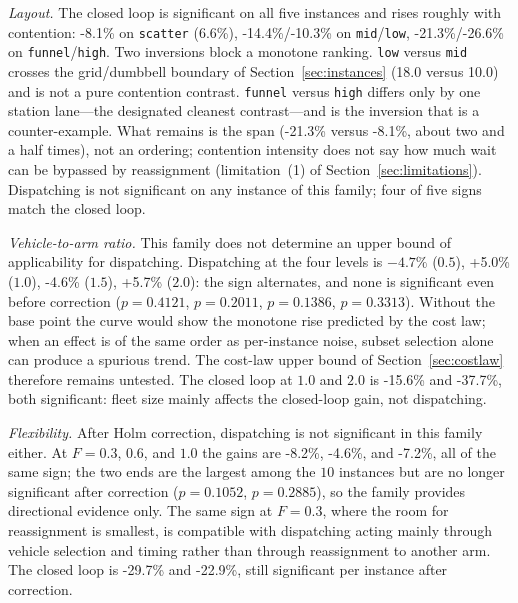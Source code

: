 \documentclass[manuscript,screen,review]{acmart}
\newcommand{\NCases}{10}
\newcommand{\GainProbeStarve}{4.7\%}     %
\newcommand{\GainProbeFleetBase}{-4.6\%} %
\newcommand{\GainProbeFleetOne}{+5.0\%}  %
\newcommand{\GainProbeFleetTwo}{+5.7\%}  %
\newcommand{\GainLoopFunnel}{-21.3\%}    %
\newcommand{\GainLoopHigh}{-26.6\%}      %
\newcommand{\GainLoopMid}{-14.4\%}       %
\newcommand{\GainLoopLow}{-10.3\%}       %
\newcommand{\GainLoopScatter}{-8.1\%}    %
\newcommand{\GainLoopFleetOne}{-15.6\%}  %
\newcommand{\GainLoopFleetTwo}{-37.7\%}  %
\newcommand{\GainLoopFlexLo}{-29.7\%}    %
\newcommand{\GainLoopFlexHi}{-22.9\%}    %
\newcommand{\GainProbeFlexLo}{-8.2\%}    %
\newcommand{\GainProbeFlexHi}{-7.2\%}    %
\newcommand{\PProbeFleetHalfRaw}{=0.4121}
\newcommand{\PProbeFleetOneRaw}{=0.2011}
\newcommand{\PProbeFleetBaseRaw}{=0.1386}
\newcommand{\PProbeFleetTwoRaw}{=0.3313}
\newcommand{\PProbeFlexLoHolm}{=0.1052}
\newcommand{\PProbeFlexHiHolm}{=0.2885}
\newcommand{\ContentionLo}{6.6\%}
\newcommand{\LegDumbbell}{10.0}          %
\newcommand{\LegGrid}{18.0}              %
\begin{document}
\emph{Layout.}
The closed loop is significant on all five instances and rises roughly with contention: \GainLoopScatter{} on \texttt{scatter} (\ContentionLo{}), \GainLoopMid{}/\GainLoopLow{} on \texttt{mid}/\texttt{low}, \GainLoopFunnel{}/\GainLoopHigh{} on \texttt{funnel}/\texttt{high}.
Two inversions block a monotone ranking.
\texttt{low} versus \texttt{mid} crosses the grid/dumbbell boundary of Section~\ref{sec:instances} (\LegGrid{} versus \LegDumbbell{}) and is not a pure contention contrast.
\texttt{funnel} versus \texttt{high} differs only by one station lane---the designated cleanest contrast---and is the inversion that is a counter-example.
What remains is the span (\GainLoopFunnel{} versus \GainLoopScatter{}, about two and a half times), not an ordering; contention intensity does not say how much wait can be bypassed by reassignment (limitation~(1) of Section~\ref{sec:limitations}).
Dispatching is not significant on any instance of this family; four of five signs match the closed loop.

\emph{Vehicle-to-arm ratio.}
This family does not determine an upper bound of applicability for dispatching.
Dispatching at the four levels is $-\GainProbeStarve$ ($0.5$), \GainProbeFleetOne{} ($1.0$), \GainProbeFleetBase{} ($1.5$), \GainProbeFleetTwo{} ($2.0$): the sign alternates, and none is significant even before correction ($p\PProbeFleetHalfRaw$, $p\PProbeFleetOneRaw$, $p\PProbeFleetBaseRaw$, $p\PProbeFleetTwoRaw$).
Without the base point the curve would show the monotone rise predicted by the cost law; when an effect is of the same order as per-instance noise, subset selection alone can produce a spurious trend.
The cost-law upper bound of Section~\ref{sec:costlaw} therefore remains untested.
The closed loop at $1.0$ and $2.0$ is \GainLoopFleetOne{} and \GainLoopFleetTwo{}, both significant: fleet size mainly affects the closed-loop gain, not dispatching.

\emph{Flexibility.}
After Holm correction, dispatching is not significant in this family either.
At $F=0.3$, $0.6$, and $1.0$ the gains are \GainProbeFlexLo{}, \GainProbeFleetBase{}, and \GainProbeFlexHi{}, all of the same sign; the two ends are the largest among the $\NCases$ instances but are no longer significant after correction ($p\PProbeFlexLoHolm$, $p\PProbeFlexHiHolm$), so the family provides directional evidence only.
The same sign at $F=0.3$, where the room for reassignment is smallest, is compatible with dispatching acting mainly through vehicle selection and timing rather than through reassignment to another arm.
The closed loop is \GainLoopFlexLo{} and \GainLoopFlexHi{}, still significant per instance after correction.
\end{document}
